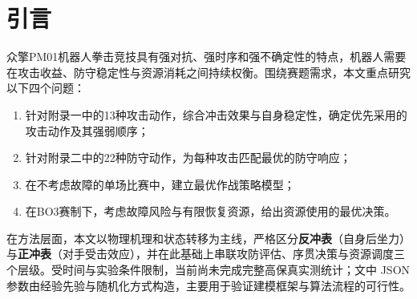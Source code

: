 \begin{abstract}
本文围绕众擎PM01机器人拳击竞技中的攻击选择、防守匹配、单场决策与故障资源调度四个核心问题，构建了一套以五状态转移为基础的建模与求解框架。首先，给出\textbf{反冲表}（攻击后自身稳定性分布）与\textbf{正冲表}（对手受击后的状态转移分布）的构建思路，据此评估13种攻击动作的综合效用并形成优先序列。其次，基于格挡概率、减伤映射与反击窗口等指标，建立防守匹配模型，为不同来袭攻击生成最优防守响应。再次，在不考虑故障的单场场景下，将攻防决策建模为马尔可夫决策过程（MDP），并通过价值迭代求解不同风险偏好下的最优策略。最后，面向三局两胜（BO3）赛制，综合人工复位、战术暂停与紧急维修等资源约束，建立线性规划与MDP耦合的调度模型。需要说明的是，本文现阶段以方法流程验证为主，结果数据主要用于算法检验，不作为高保真实测结论。
\end{abstract}

\section{引言}
众擎PM01机器人拳击竞技具有强对抗、强时序和强不确定性的特点，机器人需要在攻击收益、防守稳定性与资源消耗之间持续权衡。围绕赛题需求，本文重点研究以下四个问题：
\begin{enumerate}[label=(\arabic*)]
    \item 针对附录一中的13种攻击动作，综合冲击效果与自身稳定性，确定优先采用的攻击动作及其强弱顺序；
    \item 针对附录二中的22种防守动作，为每种攻击匹配最优的防守响应；
    \item 在不考虑故障的单场比赛中，建立最优作战策略模型；
    \item 在BO3赛制下，考虑故障风险与有限恢复资源，给出资源使用的最优决策。
\end{enumerate}
在方法层面，本文以物理机理和状态转移为主线，严格区分\textbf{反冲表}（自身后坐力）与\textbf{正冲表}（对手受击效应），并在此基础上串联攻防评估、序贯决策与资源调度三个层级。受时间与实验条件限制，当前尚未完成完整高保真实测统计；文中 JSON 参数由经验先验与随机化方式构造，主要用于验证建模框架与算法流程的可行性。
